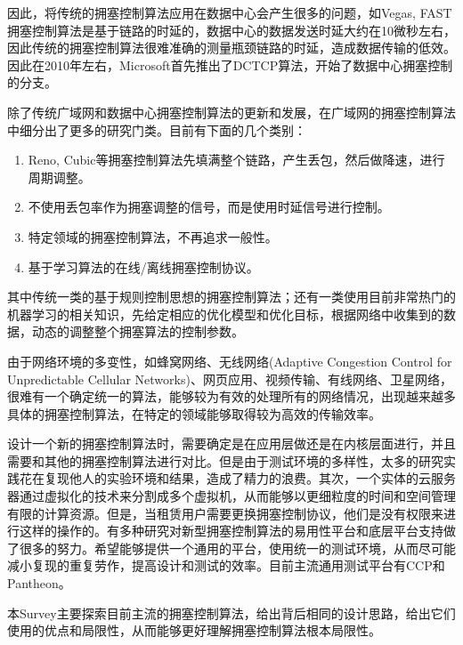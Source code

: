 \documentclass[a4paper, 12pt, UTF8]{ctexart}
\begin{document}
\par 因此，将传统的拥塞控制算法应用在数据中心会产生很多的问题，如Vegas\cite{DBLP:journals/jsac/BrakmoP95}, FAST\cite{DBLP:journals/ton/WeiJLH06}拥塞控制算法是基于链路的时延的，数据中心的数据发送时延大约在10微秒左右，因此传统的拥塞控制算法很难准确的测量瓶颈链路的时延，造成数据传输的低效。因此在2010年左右，Microsoft首先推出了DCTCP\cite{DBLP:conf/sigcomm/AlizadehGMPPPSS10}算法，开始了数据中心拥塞控制的分支。

\par 除了传统广域网和数据中心拥塞控制算法的更新和发展，在广域网的拥塞控制算法中细分出了更多的研究门类。目前有下面的几个类别：
\begin{enumerate}
	\item Reno, Cubic等拥塞控制算法先填满整个链路，产生丢包，然后做降速，进行周期调整。
	\item 不使用丢包率作为拥塞调整的信号，而是使用时延信号进行控制。
	\item 特定领域的拥塞控制算法，不再追求一般性。
	\item 基于学习算法的在线/离线拥塞控制协议。
\end{enumerate}
\par 其中传统一类的基于规则控制思想的拥塞控制算法；还有一类使用目前非常热门的机器学习的相关知识，先给定相应的优化模型和优化目标，根据网络中收集到的数据，动态的调整整个拥塞算法的控制参数。

\par 由于网络环境的多变性，如蜂窝网络、无线网络(Adaptive Congestion Control for Unpredictable Cellular Networks)、网页应用、视频传输、有线网络、卫星网络，很难有一个确定统一的算法，能够较为有效的处理所有的网络情况，出现越来越多具体的拥塞控制算法，在特定的领域能够取得较为高效的传输效率。

\par 设计一个新的拥塞控制算法时，需要确定是在应用层做还是在内核层面进行，并且需要和其他的拥塞控制算法进行对比。但是由于测试环境的多样性，太多的研究实践花在复现他人的实验环境和结果，造成了精力的浪费。其次，一个实体的云服务器通过虚拟化的技术来分割成多个虚拟机，从而能够以更细粒度的时间和空间管理有限的计算资源。但是，当租赁用户需要更换拥塞控制协议，他们是没有权限\cite{DBLP:conf/sigcomm/HeRAGFCA16}来进行这样的操作的。有多种研究对新型拥塞控制算法的易用性平台和底层平台\cite{DBLP:conf/usenix/YanMHRWLW18}支持做了很多的努力。希望能够提供一个通用的平台，使用统一的测试环境，从而尽可能减小复现的重复劳作，提高设计和测试的效率。目前主流通用测试平台有CCP\cite{CCP}和Pantheon\cite{Pantheon}。

\par 本Survey主要探索目前主流的拥塞控制算法，给出背后相同的设计思路，给出它们使用的优点和局限性，从而能够更好理解拥塞控制算法根本局限性。
\end{document}
